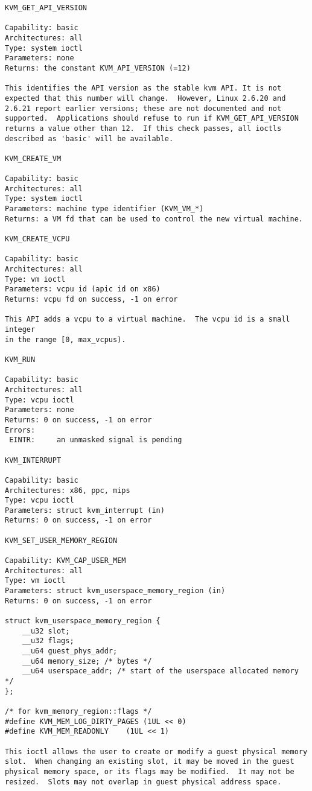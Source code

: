 \documentclass[9pt,b5paper,tombo]{jsbook}
\begin{document}
\begin{lstlisting}
KVM_GET_API_VERSION

Capability: basic
Architectures: all
Type: system ioctl
Parameters: none
Returns: the constant KVM_API_VERSION (=12)

This identifies the API version as the stable kvm API. It is not
expected that this number will change.  However, Linux 2.6.20 and
2.6.21 report earlier versions; these are not documented and not
supported.  Applications should refuse to run if KVM_GET_API_VERSION
returns a value other than 12.  If this check passes, all ioctls
described as 'basic' will be available.

KVM_CREATE_VM

Capability: basic
Architectures: all
Type: system ioctl
Parameters: machine type identifier (KVM_VM_*)
Returns: a VM fd that can be used to control the new virtual machine.

KVM_CREATE_VCPU

Capability: basic
Architectures: all
Type: vm ioctl
Parameters: vcpu id (apic id on x86)
Returns: vcpu fd on success, -1 on error

This API adds a vcpu to a virtual machine.  The vcpu id is a small integer
in the range [0, max_vcpus).

KVM_RUN

Capability: basic
Architectures: all
Type: vcpu ioctl
Parameters: none
Returns: 0 on success, -1 on error
Errors:
 EINTR:     an unmasked signal is pending

KVM_INTERRUPT

Capability: basic
Architectures: x86, ppc, mips
Type: vcpu ioctl
Parameters: struct kvm_interrupt (in)
Returns: 0 on success, -1 on error

KVM_SET_USER_MEMORY_REGION

Capability: KVM_CAP_USER_MEM
Architectures: all
Type: vm ioctl
Parameters: struct kvm_userspace_memory_region (in)
Returns: 0 on success, -1 on error

struct kvm_userspace_memory_region {
	__u32 slot;
	__u32 flags;
	__u64 guest_phys_addr;
	__u64 memory_size; /* bytes */
	__u64 userspace_addr; /* start of the userspace allocated memory */
};

/* for kvm_memory_region::flags */
#define KVM_MEM_LOG_DIRTY_PAGES	(1UL << 0)
#define KVM_MEM_READONLY	(1UL << 1)

This ioctl allows the user to create or modify a guest physical memory
slot.  When changing an existing slot, it may be moved in the guest
physical memory space, or its flags may be modified.  It may not be
resized.  Slots may not overlap in guest physical address space.
\end{lstlisting}
\end{document}
